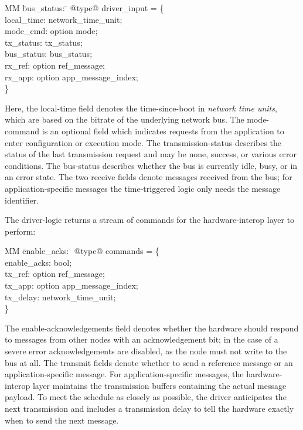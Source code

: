 \begin{tabbing}
  MM \= bus_status: \= \kill
  @type@ driver_input = \{ \\
    \> local_time: \> network_time_unit; \\
    \> mode_cmd: \> option mode; \\
    \> tx_status: \> tx_status; \\
    \> bus_status: \> bus_status; \\
    \> rx_ref: \> option ref_message; \\
    \> rx_app: \> option app_message_index; \\
    \}
\end{tabbing}

Here, the local-time field denotes the time-since-boot in \emph{network time units}, which are based on the bitrate of the underlying network bus.
The mode-command is an optional field which indicates requests from the application to enter configuration or execution mode.
The transmission-status describes the status of the last transmission request and may be none, success, or various error conditions.
The bus-status describes whether the bus is currently idle, busy, or in an error state.
The two receive fields denote messages received from the bus; for application-specific messages the time-triggered logic only needs the message identifier.

The driver-logic returns a stream of commands for the hardware-interop layer to perform:

\begin{tabbing}
  MM \= enable_acks: \= \kill
  @type@ commands = \{ \\
  \> enable_acks: \> bool; \\
  \> tx_ref: \>       option ref_message; \\
  \> tx_app: \> option app_message_index; \\
  \> tx_delay: \>     network_time_unit; \\
 \}
\end{tabbing}

The enable-acknowledgements field denotes whether the hardware should respond to messages from other nodes with an acknowledgement bit; in the case of a severe error acknowledgements are disabled, as the node must not write to the bus at all.
The transmit fields denote whether to send a reference message or an application-specific message.
For application-specific messages, the hardware-interop layer maintains the transmission buffers containing the actual message payload.
To meet the schedule as closely as possible, the driver anticipates the next transmission and includes a transmission delay to tell the hardware exactly when to send the next message.

